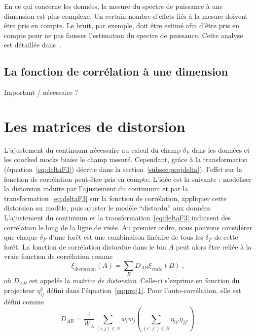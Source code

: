 \documentclass[11pt, twoside, a4paper, openright]{report}
\begin{document}
En ce qui concerne les données, la mesure du spectre de puissance à une dimension est plus complexe. Un certain nombre d'effets liés à la mesure doivent être pris en compte. Le bruit, par exemple, doit être estimé afin d'être pris en compte pour ne pas fausser l'estimation du spectre de puissance. Cette analyse est détaillée dans~\citet{Chabanier2018}.

\subsection{La fonction de corrélation à une dimension}

Important / nécessaire ?


\section{Les matrices de distorsion}
\label{sec:calcul_dmat}
L'ajustement du continuum nécessaire au calcul du champ $\delta_F$ dans les données et les coocked mocks biaise le champ mesuré. Cependant, grâce à la transformation (équation~\ref{eq:deltaF3}) décrite dans la section~\ref{subsec:projdelta}), l'effet sur la fonction de corrélation peut-être pris en compte.
L'idée est la suivante : modéliser la distorsion induite par l'ajustement du continuum et par la transformation~\ref{eq:deltaF3} sur la fonction de corrélation, appliquer cette distorsion au modèle, puis ajuster le modèle ``distordu'' aux données. L'ajustement du continuum et la transformation~\ref{eq:deltaF3} induisent des corrélation le long de la ligne de visée. Au premier ordre, nous pouvons considérer que chaque $\delta_F$ d'une forêt est une combinaison linéaire de tous les $\delta_F$ de cette forêt. La fonction de corrélation distordue dans le bin $A$ peut alors être reliée à la vraie fonction de corrélation comme
\begin{equation}
  \xi_{distortion}(A) = \sum_{B} D_{AB}\xi_{vraie}(B) \; , 
\end{equation}
où $D_{AB}$ est appelée la \emph{matrice de distorsion}. Celle-ci s'exprime en fonction du projecteur $\eta_{ij}^q$ défini dans l'équation~\ref{eq:proj1}. Pour l'auto-corrélation, elle est défini comme
\begin{equation}
  \label{eq:dmat}
  D_{AB} = \frac{1}{W_A} \sum_{(i,j)\in A} w_i w_j \left( \sum_{(i',j')\in B} \eta_{ii'} \eta_{jj'} \right) \,
\end{equation}
\end{document}
